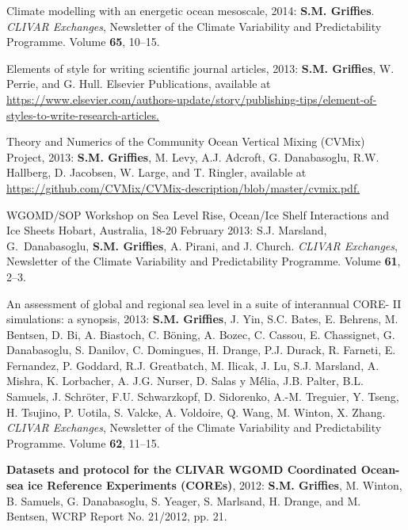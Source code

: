 \begin{etaremune}
\item Climate modelling with an energetic ocean mesoscale, 2014: {\bf
    S.M. Grif\/f\/ies}.  {\em CLIVAR Exchanges}, Newsletter of the
  Climate Variability and Predictability Programme.  Volume {\bf 65},
  10--15.

\item Elements of style for writing scientific journal articles, 2013:
  {\bf S.M. Grif\/f\/ies}, W. Perrie, and G. Hull. Elsevier
  Publications, available at \href{https://www.elsevier.com/authors-update/story/publishing-tips/element-of-styles-to-write-research-articles}{https://www.elsevier.com/authors-update/story/publishing-tips/element-of-styles-to-write-research-articles.}

\item Theory and Numerics of the Community Ocean Vertical Mixing
  (CVMix) Project, 2013: {\bf S.M. Grif\/f\/ies}, M. Levy, A.J. Adcroft,
  G. Danabasoglu, R.W. Hallberg, D. Jacobsen, W. Large, and
  T. Ringler, available at \href{https://github.com/CVMix/CVMix-description/blob/master/cvmix.pdf}{https://github.com/CVMix/CVMix-description/blob/master/cvmix.pdf.}

\item WGOMD/SOP Workshop on Sea Level Rise, Ocean/Ice Shelf
  Interactions and Ice Sheets Hobart, Australia, 18-20 February 2013:
  S.J. Marsland, G.\ Danabasoglu, {\bf S.M. Grif\/f\/ies}, A. Pirani,
  and J. Church.  {\em CLIVAR Exchanges}, Newsletter of the Climate
  Variability and Predictability Programme.  Volume {\bf 61}, 2--3.

\item An assessment of global and regional sea level in a suite of
  interannual CORE- II simulations: a synopsis, 2013: {\bf
    S.M. Grif\/f\/ies}, J. Yin, S.C. Bates, E. Behrens, M.  Bentsen,
  D. Bi, A. Biastoch, C. B\"{o}ning, A. Bozec, C. Cassou,
  E. Chassignet, G. Danabasoglu, S. Danilov, C. Domingues, H. Drange,
  P.J. Durack, R. Farneti, E. Fernandez, P. Goddard, R.J. Greatbatch,
  M. Ilicak, J. Lu, S.J. Marsland, A. Mishra, K. Lorbacher,
  A. J.G. Nurser, D. Salas y M\'{é}lia, J.B. Palter, B.L. Samuels,
  J. Schr\"{o}ter, F.U. Schwarzkopf, D. Sidorenko, A.-M. Treguier,
  Y. Tseng, H. Tsujino, P.  Uotila, S. Valcke, A. Voldoire, Q. Wang,
  M. Winton, X. Zhang. {\em CLIVAR Exchanges}, Newsletter of the
  Climate Variability and Predictability Programme.  Volume {\bf 62},
  11--15.

\item {\bf Datasets and protocol for the CLIVAR WGOMD Coordinated
    Ocean-sea ice Reference Experiments (COREs)}, 2012: {\bf
    S.M. Grif\/f\/ies}, M. Winton, B. Samuels, G. Danabasoglu,
  S. Yeager, S. Marlsand, H.  Drange, and M. Bentsen, WCRP Report
  No. 21/2012, pp. 21.


\end{etaremune}
